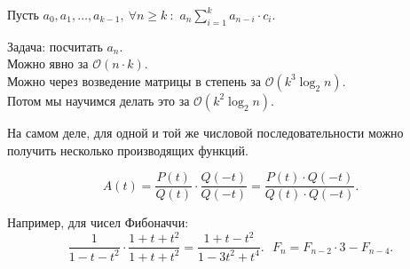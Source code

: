 Пусть $a_0, a_1, \dots, a_{k-1}, ~ \forall n\geqslant k ~:$ 
$a_n \sum_{i=1}^{k} a_{n-i}\cdot c_i$.

Задача: посчитать $a_n$.\\
Можно явно за $\mathcal{O}(n \cdot k)$.\\
Можно через возведение матрицы в степень за $\mathcal{O}(k^3 \log_2 n)$.\\
Потом мы научимся делать это за $\mathcal{O}(k^2 \log_2 n)$.

На самом деле, для одной и той же числовой последовательности можно получить несколько производящих функций.

    \[ A(t) = \dfrac{P(t)}{Q(t)} \cdot \dfrac{Q(-t)}{Q(-t)} = \dfrac{P(t) \cdot Q(-t)}{Q(t) \cdot Q(-t)}. \]

Например, для чисел Фибоначчи: 
\[ \dfrac{1}{1 - t - t^2} \cdot \dfrac{1 + t + t^2}{1 + t + t^2} = \dfrac{1 + t - t^2}{1 -3 t^2 + t ^4}. ~~~
F_n = F_{n-2} \cdot 3 - F_{n-4}. \]

\endinput